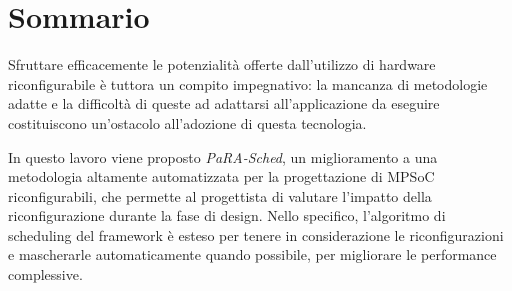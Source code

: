 \chapter*{Sommario}
\vspace{0.5cm}
Sfruttare efficacemente le potenzialit\`a offerte dall'utilizzo di hardware riconfigurabile
\`e tuttora un compito impegnativo: la mancanza di metodologie adatte e
la difficolt\`a di queste ad adattarsi all'applicazione da eseguire costituiscono
un'ostacolo all'adozione di questa tecnologia.

In questo lavoro viene proposto \emph{PaRA-Sched}, un miglioramento a una metodologia
altamente automatizzata per la progettazione di \acs{MPSoC} riconfigurabili, che permette
al progettista di valutare l'impatto della riconfigurazione durante la fase di design.
Nello specifico, l'algoritmo di scheduling del framework \`e esteso per tenere in considerazione
le riconfigurazioni e mascherarle automaticamente quando possibile, per migliorare le
performance complessive.

